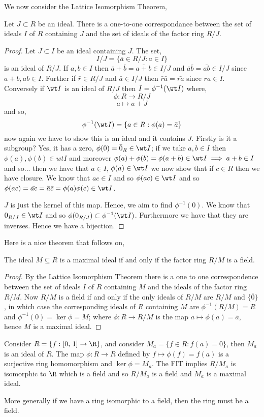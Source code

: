 We now consider the Lattice Isomorphism Theorem,
\begin{nthm}
  Let $J \subset R$ be an ideal. There is a one-to-one correspondance between the set of ideals $I$ of $R$ containing $J$ and the set of ideals of the factor ring $R/J$.
\end{nthm}
\begin{proof}
  Let $J \subset I$ be an ideal containing $J$. The set,
  $$ I/J = \{\bar a \in R/J : a \in I\} $$
  is an ideal of $R/J$. If $a,b \in I$ then $\bar a + \bar b = \bar{a + b} \in I/J$ and $\bar a \bar b = \bar{ab} \in I/J$ since $a+b, ab \in I$. Further if $\bar r \in R/J$ and $\bar a \in I/J$ then $\bar r \bar a = \bar{ra}$ since $ra \in I$. Conversely if $\wt I$ is an ideal of $R/J$ then $I = \phi^{-1}(\wt I)$ where,
  $$ \phi : R \to R/J $$
  $$ a \mapsto a + J $$
  and so,
  $$ \phi^{-1}(\wt I) = \{a \in R : \phi(a) = \bar a\} $$
  now again we have to show this is an ideal and it contains $J$. Firstly is it a subgroup? Yes, it has a zero, $\phi(0) = \bar 0_R \in \wt I$; if we take $a, b \in I$ then $\phi(a), \phi(b) \in wt I$ and moreover $\phi(a) + \phi(b) = \phi(a + b) \in \wt I \implies a + b \in I$ and so... then we have that $a \in I$, $\phi(a) \in \wt I$ we now show that if $c \in R$ then we have closure. We know that $ac \in I$ and so $\phi(ac) \in \wt I$ and so $\phi(ac) = \bar{ac} = \bar a \bar c = \phi(a)\phi(c) \in \wt I$.

  \noindent
  $J$ is just the kernel of this map. Hence, we aim to find $\phi^{-1}(0)$. We know that $0_{R/J} \in \wt I$ and so $\phi(0_{R/J}) \subset \phi^{-1}(\wt I)$. Furthermore we have that they are inverses. Hence we have a bijection.
\end{proof}

Here is a nice theorem that follows on,
\begin{nthm}
  The ideal $M \subseteq R$ is a maximal ideal if and only if the factor ring $R/M$ is a field.
\end{nthm}
\begin{proof}
  By the Lattice Isomorphism Theorem there is a one to one correspondence between the set of ideals $I$ of $R$ containing $M$ and the ideals of the factor ring $R/M$. Now $R/M$ is a field if and only if the only ideals of $R/M$ are $R/M$ and $\{\bar 0\}$, in which case the corresponding ideals of $R$ containing $M$ are $\phi^{-1}(R/M) = R$ and $\phi^{-1}(0) = \ker \phi = M$; where $\phi: R \to R/M$ is the map $a \mapsto \phi(a) = \bar a$, hence $M$ is a maximal ideal.
\end{proof}

\begin{eg}
  Consider $R = \{f : [0,\,1] \to \R\}$, and consider $M_a = \{f \in R : f(a) = 0\}$, then $M_a$ is an ideal of $R$. The map $\phi : R \to R$ defined by $f \mapsto \phi(f) = f(a)$ is a surjective ring homomorphism and $\ker \phi = M_a$. The FIT implies $R/M_a$ is isomorphic to $\R$ which is a field and so $R/M_a$ is a field and $M_a$ is a maximal ideal.
\end{eg}

\noindent
More generally if we have a ring isomorphic to a field, then the ring must be a field.